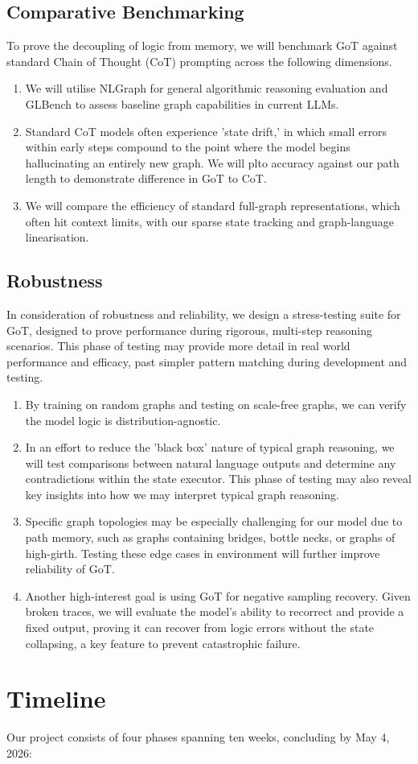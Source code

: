 \documentclass[sigplan,screen]{acmart}
\begin{document}
\subsection{Comparative Benchmarking}
  To prove the decoupling of logic from memory, we will benchmark GoT against standard Chain of Thought (CoT) prompting across the following dimensions.
  \begin{enumerate}
    \item We will utilise NLGraph for general algorithmic reasoning evaluation and GLBench to assess baseline graph capabilities in current LLMs.
    \item Standard CoT models often experience 'state drift,' in which small errors within early steps compound to the point where the model begins hallucinating an entirely new graph. We will plto accuracy against our path length to demonstrate difference in GoT to CoT.
    \item We will compare the efficiency of standard full-graph representations, which often hit context limits, with our sparse state tracking and graph-language linearisation.
  \end{enumerate}

\subsection{Robustness}
  In consideration of robustness and reliability, we design a stress-testing suite for GoT, designed to prove performance during rigorous, multi-step reasoning scenarios. This phase of testing may provide more detail in real world performance and efficacy, past simpler pattern matching during development and testing.
  \begin{enumerate}
    \item By training on random graphs and testing on scale-free graphs, we can verify the model logic is distribution-agnostic.
    \item In an effort to reduce the 'black box' nature of typical graph reasoning, we will test comparisons between natural language outputs and determine any contradictions within the state executor. This phase of testing may also reveal key insights into how we may interpret typical graph reasoning.
    \item Specific graph topologies may be especially challenging for our model due to path memory, such as graphs containing bridges, bottle necks, or graphs of high-girth. Testing these edge cases in environment will further improve reliability of GoT.
    \item Another high-interest goal is using GoT for negative sampling recovery. Given broken traces, we will evaluate the model's ability to recorrect and provide a fixed output, proving it can recover from logic errors without the state collapsing, a key feature to prevent catastrophic failure.
  \end{enumerate}


\section{Timeline}

Our project consists of four phases spanning ten weeks, concluding by May 4, 2026:  






\end{document}
